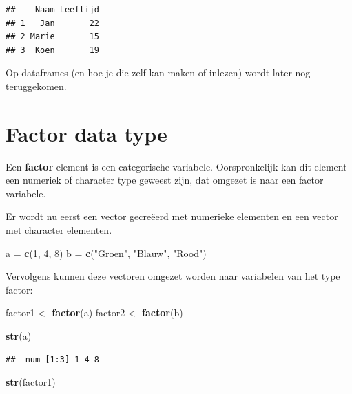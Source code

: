 \documentclass[
]{book}
\newenvironment{Shaded}{\begin{snugshade}}{\end{snugshade}}
\newcommand{\DecValTok}[1]{\textcolor[rgb]{0.00,0.00,0.81}{#1}}
\newcommand{\FunctionTok}[1]{\textcolor[rgb]{0.13,0.29,0.53}{\textbf{#1}}}
\newcommand{\NormalTok}[1]{#1}
\newcommand{\OtherTok}[1]{\textcolor[rgb]{0.56,0.35,0.01}{#1}}
\newcommand{\StringTok}[1]{\textcolor[rgb]{0.31,0.60,0.02}{#1}}
\begin{document}
\begin{verbatim}
##    Naam Leeftijd
## 1   Jan       22
## 2 Marie       15
## 3  Koen       19
\end{verbatim}

Op dataframes (en hoe je die zelf kan maken of inlezen) wordt later nog teruggekomen.

\hypertarget{factor-data-type}{%
\section{Factor data type}\label{factor-data-type}}

Een \textbf{factor} element is een categorische variabele. Oorspronkelijk kan dit element een numeriek of character type geweest zijn, dat omgezet is naar een factor variabele.

Er wordt nu eerst een vector gecreëerd met numerieke elementen en een vector met character elementen.

\begin{Shaded}
\begin{Highlighting}[]
\NormalTok{a }\OtherTok{=} \FunctionTok{c}\NormalTok{(}\DecValTok{1}\NormalTok{, }\DecValTok{4}\NormalTok{, }\DecValTok{8}\NormalTok{)}
\NormalTok{b }\OtherTok{=} \FunctionTok{c}\NormalTok{(}\StringTok{"Groen"}\NormalTok{, }\StringTok{"Blauw"}\NormalTok{, }\StringTok{"Rood"}\NormalTok{)}
\end{Highlighting}
\end{Shaded}

Vervolgens kunnen deze vectoren omgezet worden naar variabelen van het type factor:

\begin{Shaded}
\begin{Highlighting}[]
\NormalTok{factor1 }\OtherTok{\textless{}{-}} \FunctionTok{factor}\NormalTok{(a)}
\NormalTok{factor2 }\OtherTok{\textless{}{-}} \FunctionTok{factor}\NormalTok{(b)}

\FunctionTok{str}\NormalTok{(a)}
\end{Highlighting}
\end{Shaded}

\begin{verbatim}
##  num [1:3] 1 4 8
\end{verbatim}

\begin{Shaded}
\begin{Highlighting}[]
\FunctionTok{str}\NormalTok{(factor1)}
\end{Highlighting}
\end{Shaded}
\end{document}
